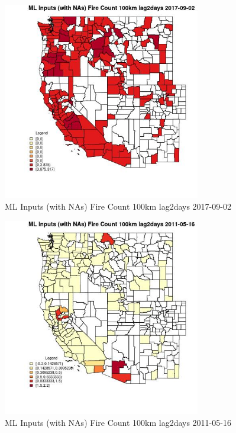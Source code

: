 \begin{figure} 
\centering  
\includegraphics[width=0.77\textwidth]{Code_Outputs/Report_ML_input_PM25_Step4_part_e_de_duplicated_aves_compiled_2019-05-20wNAs_CountyFire_Count_100km_lag2daysMean2017-09-02.jpg} 
\caption{\label{fig:Report_ML_input_PM25_Step4_part_e_de_duplicated_aves_compiled_2019-05-20wNAsCountyFire_Count_100km_lag2daysMean2017-09-02}ML Inputs (with NAs) Fire Count 100km lag2days 2017-09-02} 
\end{figure} 
 

\begin{figure} 
\centering  
\includegraphics[width=0.77\textwidth]{Code_Outputs/Report_ML_input_PM25_Step4_part_e_de_duplicated_aves_compiled_2019-05-20wNAs_CountyFire_Count_100km_lag2daysMean2011-05-16.jpg} 
\caption{\label{fig:Report_ML_input_PM25_Step4_part_e_de_duplicated_aves_compiled_2019-05-20wNAsCountyFire_Count_100km_lag2daysMean2011-05-16}ML Inputs (with NAs) Fire Count 100km lag2days 2011-05-16} 
\end{figure} 
 

